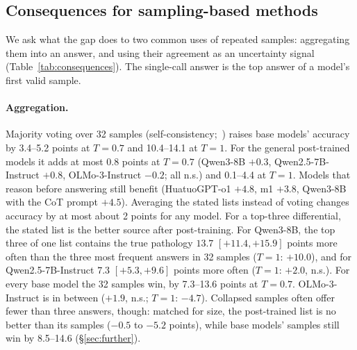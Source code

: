 \documentclass[11pt]{article}
\begin{document}
\subsection{Consequences for sampling-based methods}\label{sec:consequences}
We ask what the gap does to two common uses of repeated samples: aggregating them into an answer, and using their agreement as an uncertainty signal (Table~\ref{tab:consequences}). The single-call answer is the top answer of a model's first valid sample.

\paragraph{Aggregation.}
Majority voting over 32 samples (self-consistency;~\citealp{wang2023selfconsistency}) raises base models' accuracy by 3.4--5.2 points at $T{=}0.7$ and 10.4--14.1 at $T{=}1$.
For the general post-trained models it adds at most 0.8 points at $T{=}0.7$ (Qwen3-8B $+0.3$, Qwen2.5-7B-Instruct $+0.8$, OLMo-3-Instruct $-0.2$; all n.s.) and 0.1--4.4 at $T{=}1$.
Models that reason before answering still benefit (HuatuoGPT-o1 $+4.8$, m1 $+3.8$, Qwen3-8B with the CoT prompt $+4.5$).
Averaging the stated lists instead of voting changes accuracy by at most about 2 points for any model.
For a top-three differential, the stated list is the better source after post-training. For Qwen3-8B, the top three of one list contains the true pathology $13.7$ $[+11.4,+15.9]$ points more often than the three most frequent answers in 32 samples ($T{=}1$: $+10.0$), and for Qwen2.5-7B-Instruct $7.3$ $[+5.3,+9.6]$ points more often ($T{=}1$: $+2.0$, n.s.).
For every base model the 32 samples win, by 7.3--13.6 points at $T{=}0.7$. OLMo-3-Instruct is in between ($+1.9$, n.s.; $T{=}1$: $-4.7$). Collapsed samples often offer fewer than three answers, though: matched for size, the post-trained list is no better than its samples ($-0.5$ to $-5.2$ points), while base models' samples still win by 8.5--14.6 (\S\ref{sec:further}).
\end{document}
